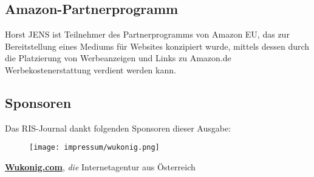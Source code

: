 \subsection*{Amazon-Partnerprogramm}
Horst JENS ist Teilnehmer des Partnerprogramms von Amazon EU, das zur Bereitstellung eines Mediums für Websites konzipiert wurde, mittels dessen durch die Platzierung von Werbeanzeigen und Links zu Amazon.de Werbekostenerstattung verdient werden kann.

\subsection*{Sponsoren}
Das RIS-Journal dankt folgenden Sponsoren dieser Ausgabe:
\begin{figure}
\texttt{[image: impressum/wukonig.png]}
\end{figure}
\href{http://wukonig.com}{\textbf{Wukonig.com}}, \textit{die} Internetagentur aus Österreich
